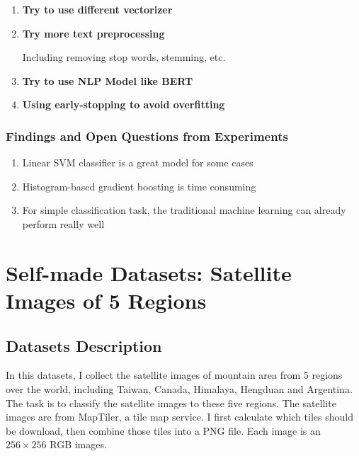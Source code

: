 \documentclass[twocolumn]{extarticle}
\begin{document}
\begin{enumerate}
\item \textbf{Try to use different vectorizer}
\item \textbf{Try more text preprocessing}

Including removing stop words, stemming, etc.

\item \textbf{Try to use NLP Model like BERT}
\item \textbf{Using early-stopping to avoid overfitting}
\end{enumerate}

\subsubsection{Findings and Open Questions from Experiments}

\begin{enumerate}
\item Linear SVM classifier is a great model for some cases
\item Histogram-based gradient boosting is time consuming
\item For simple classification task, the traditional machine learning can already perform really well
\end{enumerate}

\section{Self-made Datasets: Satellite Images of 5 Regions}
\subsection{Datasets Description}

In this datasets, I collect the satellite images of mountain area from 5 regions over the world, including Taiwan, Canada, Himalaya, Hengduan and Argentina. The task is to classify the satellite images to these five regions. The satellite images are from MapTiler, a tile map service. I first calculate which tiles should be download, then combine those tiles into a PNG file. Each image is an $256 \times 256$ RGB images.
\end{document}
